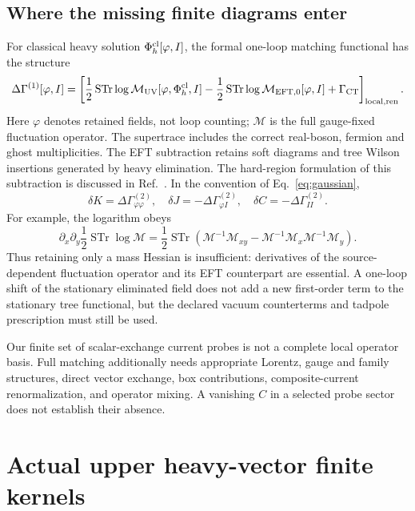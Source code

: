 \documentclass[11pt]{article}
\newcommand{\STr}{\operatorname{STr}}
\newcommand{\ellight}{\varphi}
\begin{document}
\subsection{Where the missing finite diagrams enter}
For classical heavy solution $\Phi_h^{\rm cl}[\ellight,I]$, the formal
one-loop matching functional has the structure
\begin{equation}\label{eq:hard}
 \Delta\Gamma^{(1)}[\ellight,I]=
 \left[\frac12\STr\log\mathcal M_{\rm UV}[\ellight,\Phi_h^{\rm cl},I]
 -\frac12\STr\log\mathcal M_{{\rm EFT},0}[\ellight,I]
 +\Gamma_{\rm CT}\right]_{\rm local,ren}.
\end{equation}
Here $\ellight$ denotes retained fields, not loop counting;
$\mathcal M$ is the full gauge-fixed fluctuation operator. The supertrace
includes the correct real-boson, fermion and ghost multiplicities.
The EFT subtraction retains soft diagrams and tree Wilson insertions
generated by heavy elimination. The hard-region formulation of this
subtraction is discussed in Ref.~\cite{henning}.
In the convention of Eq.~\eqref{eq:gaussian},
\begin{equation}
 \delta K=\Delta\Gamma_{\ellight\ellight}^{(2)},\quad
 \delta J=-\Delta\Gamma_{\ellight I}^{(2)},\quad
 \delta C=-\Delta\Gamma_{II}^{(2)}.
\end{equation}
For example, the logarithm obeys
\begin{equation}
 \partial_x\partial_y\frac12\STr\log\mathcal M
 =\frac12\STr\left(\mathcal M^{-1}\mathcal M_{xy}
 -\mathcal M^{-1}\mathcal M_x\mathcal M^{-1}\mathcal M_y\right).
\end{equation}
Thus retaining only a mass Hessian is insufficient: derivatives of the
source-dependent fluctuation operator and its EFT counterpart are
essential. A one-loop shift of the stationary eliminated field does not
add a new first-order term to the stationary tree functional, but the
declared vacuum counterterms and tadpole prescription must still be used.

Our finite set of scalar-exchange current probes is not a complete local
operator basis. Full matching additionally needs appropriate Lorentz,
gauge and family structures, direct vector exchange, box contributions,
composite-current renormalization, and operator mixing. A vanishing
$C$ in a selected probe sector does not establish their absence.

\section{Actual upper heavy-vector finite kernels}
\end{document}
